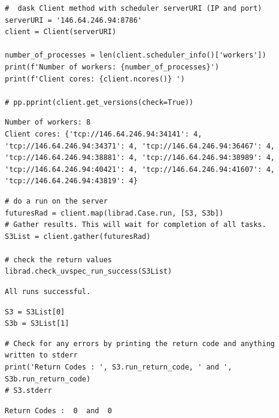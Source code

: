 \begin{lstlisting}[style=tinysize]
#  dask Client method with scheduler serverURI (IP and port)
serverURI = '146.64.246.94:8786'
client = Client(serverURI)

number_of_processes = len(client.scheduler_info()['workers'])
print(f'Number of workers: {number_of_processes}')
print(f'Client cores: {client.ncores()} ')

# pp.pprint(client.get_versions(check=True))

\end{lstlisting}


\begin{lstlisting}[style=outcellstyle]
Number of workers: 8
Client cores: {'tcp://146.64.246.94:34141': 4, 'tcp://146.64.246.94:34371': 4, 'tcp://146.64.246.94:36467': 4, 'tcp://146.64.246.94:38881': 4, 'tcp://146.64.246.94:38989': 4, 'tcp://146.64.246.94:40421': 4, 'tcp://146.64.246.94:41607': 4, 'tcp://146.64.246.94:43819': 4} 

\end{lstlisting}


\begin{lstlisting}[style=tinysize]
# do a run on the server
futuresRad = client.map(librad.Case.run, [S3, S3b])
# Gather results. This will wait for completion of all tasks.
S3List = client.gather(futuresRad)    

# check the return values
librad.check_uvspec_run_success(S3List)
\end{lstlisting}


\begin{lstlisting}[style=outcellstyle]
All runs successful.

\end{lstlisting}


\begin{lstlisting}[style=tinysize]
S3 = S3List[0]
S3b = S3List[1]
\end{lstlisting}


\begin{lstlisting}[style=tinysize]
# Check for any errors by printing the return code and anything written to stderr
print('Return Codes : ', S3.run_return_code, ' and ', S3b.run_return_code)
# S3.stderr
\end{lstlisting}


\begin{lstlisting}[style=outcellstyle]
Return Codes :  0  and  0

\end{lstlisting}


